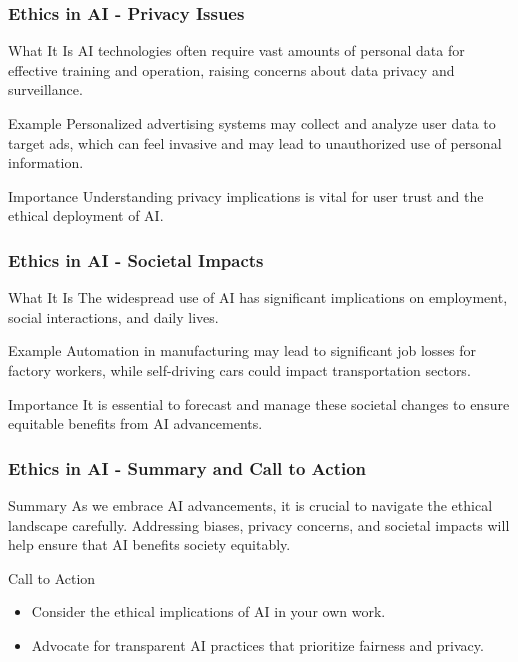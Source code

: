\documentclass{beamer}
\begin{document}
\begin{frame}[fragile]
    \frametitle{Ethics in AI - Privacy Issues}
    \begin{block}{What It Is}
        AI technologies often require vast amounts of personal data for effective training and operation, raising concerns about data privacy and surveillance.
    \end{block}
    \begin{block}{Example}
        Personalized advertising systems may collect and analyze user data to target ads, which can feel invasive and may lead to unauthorized use of personal information.
    \end{block}
    \begin{block}{Importance}
        Understanding privacy implications is vital for user trust and the ethical deployment of AI.
    \end{block}
\end{frame}

\begin{frame}[fragile]
    \frametitle{Ethics in AI - Societal Impacts}
    \begin{block}{What It Is}
        The widespread use of AI has significant implications on employment, social interactions, and daily lives.
    \end{block}
    \begin{block}{Example}
        Automation in manufacturing may lead to significant job losses for factory workers, while self-driving cars could impact transportation sectors.
    \end{block}
    \begin{block}{Importance}
        It is essential to forecast and manage these societal changes to ensure equitable benefits from AI advancements.
    \end{block}
\end{frame}

\begin{frame}[fragile]
    \frametitle{Ethics in AI - Summary and Call to Action}
    \begin{block}{Summary}
        As we embrace AI advancements, it is crucial to navigate the ethical landscape carefully. Addressing biases, privacy concerns, and societal impacts will help ensure that AI benefits society equitably.
    \end{block}
    \begin{block}{Call to Action}
        \begin{itemize}
            \item Consider the ethical implications of AI in your own work.
            \item Advocate for transparent AI practices that prioritize fairness and privacy.
        \end{itemize}
    \end{block}
\end{frame}
\end{document}
